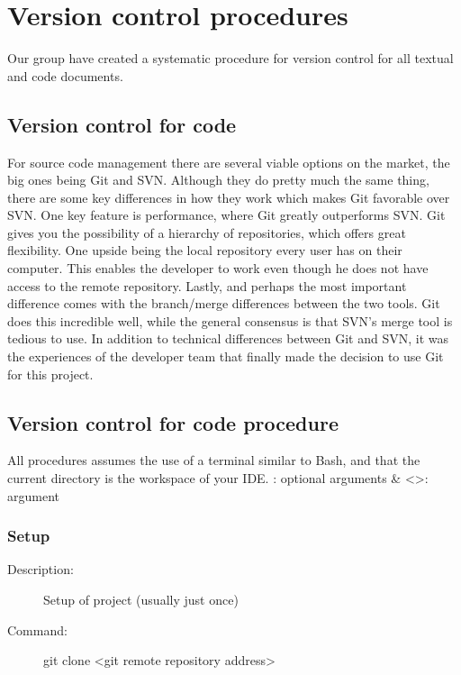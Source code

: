 

\section{Version control procedures}
Our group have created a systematic procedure for version control for all textual  and code documents. 

\subsection{Version control for code}
For source code management there are several viable options on the market, the big ones being Git and SVN. Although they do pretty much the same thing, there are some key differences in how they work which makes Git favorable over SVN. One key feature is performance, where Git greatly outperforms SVN. Git gives you the possibility of a hierarchy of repositories, which offers great flexibility. One upside being the local repository every user has on their computer. This enables the developer to work even though he does not have access to the remote repository. Lastly, and perhaps the most important difference comes with the branch/merge differences between the two tools. Git does this incredible well, while the general consensus is that SVN’s merge tool is tedious to use.  
\newline
\newline
In addition to technical differences between Git and SVN, it was the experiences of the developer team that finally made the decision to use Git for this project.

\subsection{Version control for code procedure}
All procedures assumes the use of a terminal similar to Bash, and that the current directory is the workspace of your IDE.
\newline
\newline
[]: optional arguments \& <>: argument

\subsubsection{Setup}
\begin{description}
\item[Description:] Setup of project (usually just once)
\item[Command:] git clone <git remote repository address>
\end{description}

